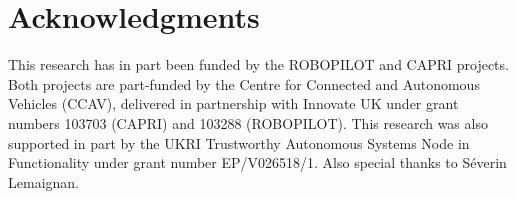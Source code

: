 
\section{Acknowledgments}
This research has in part been funded by the ROBOPILOT and CAPRI projects. Both projects are part-funded by the Centre for Connected and Autonomous Vehicles (CCAV), delivered in partnership with Innovate UK under grant numbers 103703 (CAPRI) and 103288 (ROBOPILOT). This research was also supported in part by the UKRI Trustworthy Autonomous Systems Node in Functionality under grant number EP/V026518/1. Also special thanks to S\'everin Lemaignan.
